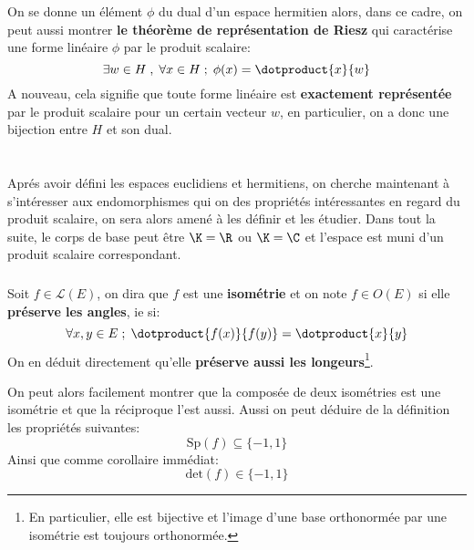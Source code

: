 \subsection*{}
On se donne un élément \(\phi\) du dual d'un espace hermitien alors, dans ce cadre, on peut aussi montrer \textbf{le théorème de représentation de Riesz} qui caractérise une forme linéaire \(\phi\) par le produit scalaire:
\[
   \exists w \in H \; , \; \forall x \in H \; ; \; \phi(x) = \dotproduct{x}{w}   
\]
A nouveau, cela signifie que toute forme linéaire est \textbf{exactement représentée} par le produit scalaire pour un certain vecteur \(w\), en particulier, on a donc une bijection entre \(H\) et son dual.\<
\chapter*{}
Aprés avoir défini les espaces euclidiens et hermitiens, on cherche maintenant à s'intéresser aux endomorphismes qui on des propriétés intéressantes en regard du produit scalaire, on sera alors amené à les définir et les étudier. Dans tout la suite, le corps de base peut être \(\K = \R\) ou \(\K = \C\) et l'espace est muni d'un produit scalaire correspondant.
\subsection*{}
Soit \(f \in \mathcal{L}(E)\), on dira que \(f\) est une \textbf{isométrie} et on note \(f \in O(E)\) si elle \textbf{préserve les angles}, ie si:
\[
   \forall x, y \in E \; ; \; \dotproduct{f(x)}{f(y)} = \dotproduct{x}{y}   
\]
On en déduit directement qu'elle \textbf{préserve aussi les longeurs}\footnote[1]{En particulier, elle est bijective et l'image d'une base orthonormée par une isométrie est toujours orthonormée.}.\<

On peut alors facilement montrer que la composée de deux isométries est une isométrie et que la réciproque l'est aussi. Aussi on peut déduire de la définition les propriétés suivantes:
\[
   \text{Sp}(f) \subseteq \{-1, 1\}   
\]
Ainsi que comme corollaire immédiat:
\[
   \text{det}(f) \in \{-1, 1\}
\]
